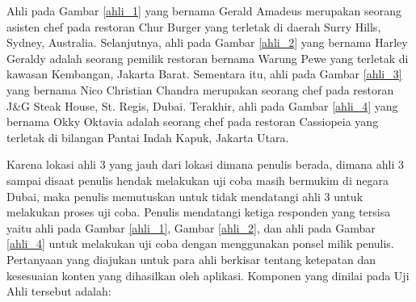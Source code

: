 		Ahli pada Gambar \ref{ahli_1} yang bernama Gerald Amadeus merupakan seorang asisten chef pada restoran Chur Burger yang terletak di daerah Surry Hills, Sydney, Australia. Selanjutnya, ahli pada Gambar \ref{ahli_2} yang bernama Harley Geraldy adalah seorang pemilik restoran bernama Warung Pewe yang terletak di kawasan Kembangan, Jakarta Barat. Sementara itu, ahli pada Gambar \ref{ahli_3} yang bernama Nico Christian Chandra merupakan seorang chef pada restoran J\&G Steak House, St. Regis, Dubai. Terakhir, ahli pada Gambar \ref{ahli_4} yang bernama Okky Oktavia adalah seorang chef pada restoran Cassiopeia yang terletak di bilangan Pantai Indah Kapuk, Jakarta Utara. 
		
		Karena lokasi ahli 3 yang jauh dari lokasi dimana penulis berada, dimana ahli 3 sampai disaat penulis hendak melakukan uji coba masih bermukim di negara Dubai, maka penulis memutuskan untuk tidak mendatangi ahli 3 untuk melakukan proses uji coba.  Penulis mendatangi ketiga responden yang tersisa yaitu ahli pada Gambar \ref{ahli_1}, Gambar \ref{ahli_2}, dan ahli pada Gambar \ref{ahli_4} untuk melakukan uji coba dengan menggunakan ponsel milik penulis. Pertanyaan yang diajukan untuk para ahli berkisar tentang ketepatan dan kesesuaian konten yang dihasilkan oleh aplikasi. Komponen yang dinilai pada Uji Ahli tersebut adalah:
